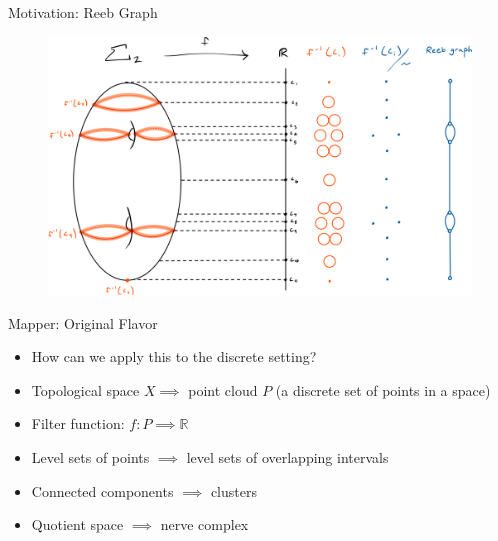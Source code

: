 \documentclass{beamer}
\begin{document}
\begin{frame}{Motivation: Reeb Graph}
  \begin{figure}
    \begin{center}
      \hspace*{-.6cm}\includegraphics[width=1.1\textwidth]{reeb.png}
    \end{center}
  \end{figure}
\end{frame}

\begin{frame}{Mapper: Original Flavor}
\begin{itemize}
  \item How can we apply this to the discrete setting?
  \item Topological space $X \implies$ point cloud $P$ (a discrete set of points in a space)
  \item Filter function: $f: P\implies\mathbb{R}$
  \item Level sets of points $\implies$ level sets of overlapping intervals
  \item Connected components $\implies$ clusters
  \item Quotient space $\implies$ nerve complex
\end{itemize}
\end{frame}
\end{document}
